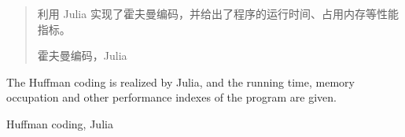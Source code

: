 \documentclass[../main]{subfiles}
\begin{document}
\begin{abstract}
  利用 Julia 实现了霍夫曼编码，并给出了程序的运行时间、占用内存等性能指标。

  \begin{keyword}
    霍夫曼编码，Julia
  \end{keyword}
\end{abstract}

\begin{abstract*}
  The Huffman coding is realized by Julia, and the running time, memory
  occupation and other performance indexes of the program are given.

  \begin{keyword*}
    Huffman coding, Julia
  \end{keyword*}
\end{abstract*}
\end{document}
